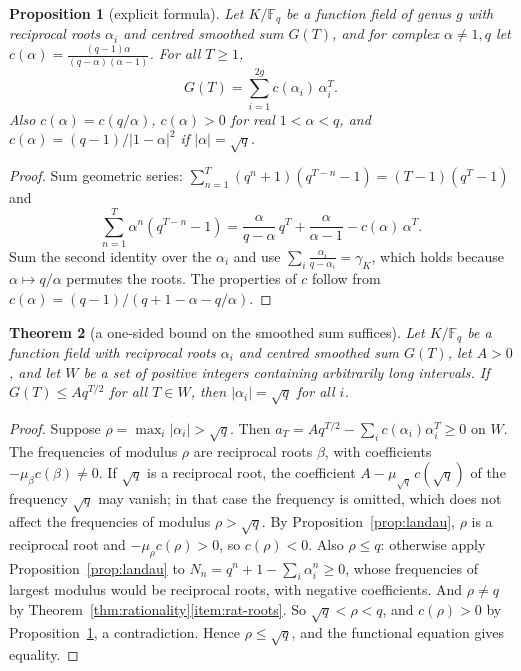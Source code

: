 \documentclass[11pt]{amsbook}
\theoremstyle{plain}
\newtheorem{theorem}{Theorem}[section]
\newtheorem{proposition}[theorem]{Proposition}
\theoremstyle{definition}
\theoremstyle{remark}
\numberwithin{equation}{section}
\numberwithin{figure}{chapter}
\numberwithin{table}{chapter}
\newcommand{\F}{\mathbb{F}}
\begin{document}
\begin{proposition}[explicit formula]\label{prop:explicit-G}
Let $K/\F_q$ be a function field of genus $g$ with reciprocal roots
$\alpha_i$ and centred smoothed sum $G(T)$, and for complex
$\alpha\ne1,q$ let
$c(\alpha)=\frac{(q-1)\alpha}{(q-\alpha)(\alpha-1)}$. For all
$T\ge1$,
\begin{equation}\label{eq:explicit-G}
G(T)=\sum_{i=1}^{2g}c(\alpha_i)\,\alpha_i^T.
\end{equation}
Also $c(\alpha)=c(q/\alpha)$, $c(\alpha)>0$ for real
$1<\alpha<q$, and $c(\alpha)=(q-1)/\lvert1-\alpha\rvert^2$ if
$\lvert\alpha\rvert=\sqrt q$.
\end{proposition}

\begin{proof}
Sum geometric series:
$\sum_{n=1}^T(q^n+1)(q^{T-n}-1)=(T-1)(q^T-1)$ and
\[
\sum_{n=1}^T\alpha^n(q^{T-n}-1)=\frac{\alpha}{q-\alpha}\,q^T
+\frac{\alpha}{\alpha-1}-c(\alpha)\,\alpha^T.
\]
Sum the second identity over the $\alpha_i$ and use
$\sum_i\frac{\alpha_i}{q-\alpha_i}=\gamma_K$, which holds because
$\alpha\mapsto q/\alpha$ permutes the roots. The properties of $c$
follow from $c(\alpha)=(q-1)/(q+1-\alpha-q/\alpha)$.
\end{proof}

\begin{theorem}[a one-sided bound on the smoothed sum suffices]
\label{thm:route2prime}
Let $K/\F_q$ be a function field with reciprocal roots $\alpha_i$
and centred smoothed sum $G(T)$, let $A>0$, and let $W$ be a set of
positive integers containing arbitrarily long intervals. If
$G(T)\le Aq^{T/2}$ for all $T\in W$,
then $\lvert\alpha_i\rvert=\sqrt q$ for all $i$.
\end{theorem}

\begin{proof}
Suppose $\rho=\max_i\lvert\alpha_i\rvert>\sqrt q$. Then
$a_T=Aq^{T/2}-\sum_ic(\alpha_i)\alpha_i^T\ge0$ on $W$. The
frequencies of modulus $\rho$ are reciprocal roots $\beta$, with
coefficients $-\mu_\beta c(\beta)\ne0$. If $\sqrt q$ is a reciprocal
root, the coefficient $A-\mu_{\sqrt q}\,c(\sqrt q)$ of the frequency
$\sqrt q$ may vanish; in that case the frequency is omitted, which
does not affect the frequencies of modulus $\rho>\sqrt q$. By
Proposition~\ref{prop:landau}, $\rho$ is a reciprocal root and
$-\mu_\rho c(\rho)>0$, so $c(\rho)<0$. Also $\rho\le q$: otherwise
apply Proposition~\ref{prop:landau} to
$N_n=q^n+1-\sum_i\alpha_i^n\ge0$, whose frequencies of largest
modulus would be reciprocal roots, with negative coefficients. And
$\rho\ne q$ by
Theorem~\ref{thm:rationality}\eqref{item:rat-roots}. So
$\sqrt q<\rho<q$, and $c(\rho)>0$ by
Proposition~\ref{prop:explicit-G}, a contradiction. Hence
$\rho\le\sqrt q$, and the functional equation gives equality.
\end{proof}
\end{document}
